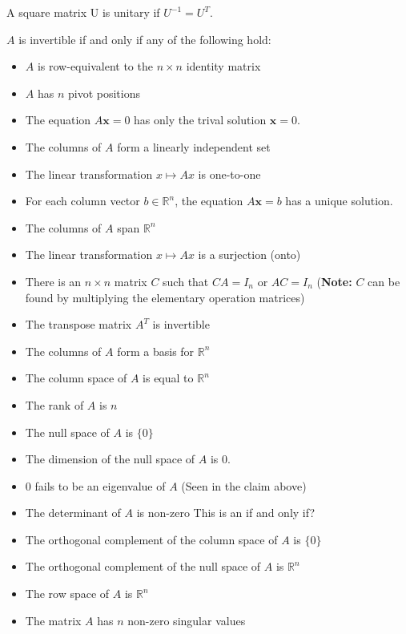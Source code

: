 \documentclass[../main.tex]{subfiles}
\begin{document}
\begin{definition}
A square matrix U is unitary if $U^{-1} = U^T$.
\end{definition}

\begin{theorem}
$A$ is invertible if and only if any of the following hold:
\begin{itemize}
	\item $A$ is row-equivalent to the $n \times n$ identity matrix
	\item $A$ has $n$ pivot positions
	\item The equation $A\textbf{x}=0$ has only the trival solution $\textbf{x} = 0$.
	\item The columns of $A$ form a linearly independent set
	\item The linear transformation $x\mapsto Ax$ is one-to-one
	\item For each column vector $b\in \mathbb{R}^n$, the equation $A\textbf{x}=b$ has a unique solution.
	\item The columns of $A$ span $\mathbb{R}^n$
	\item The linear transformation $x\mapsto Ax$ is a surjection (onto)
	\item There is an $n \times n$ matrix $C$ such that $CA = I_n$ or $AC = I_n$ (\textbf{Note:} $C$ can be found by multiplying the elementary operation matrices)
	\item \color{red}The transpose matrix $A^T$ is invertible
	\item The columns of $A$ form a basis for $\mathbb{R}^n$
	\item The column space of $A$ is equal to $\mathbb{R}^n$
	\item \color{red}The rank of $A$ is $n$\color{black}
	\item The null space of $A$ is $\{0\}$
	\item The dimension of the null space of $A$ is 0.
	\item $0$ fails to be an eigenvalue of $A$ (Seen in the claim above)
	\item The determinant of $A$ is non-zero \color{red} This is an if and only if?\color{black}
	\item \color{red}The orthogonal complement of the column space of $A$ is $\{0\}$\color{black}
	\item \color{red} The orthogonal complement of the null space of $A$ is $\mathbb{R}^n$\color{black}
	\item The row space of $A$ is $\mathbb{R}^n$
	\item The matrix $A$ has $n$ non-zero singular values
\end{itemize}
\end{theorem}
\end{document}
